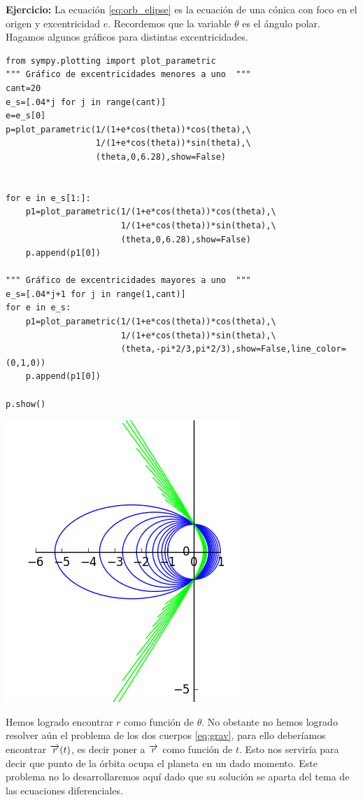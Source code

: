 \noindent\textbf{Ejercicio:} La ecuación \eqref{eq:orb_elipse} es la ecuación de una cónica con foco en el origen y excentricidad $e$.
Recordemos que la variable $\theta$ es el ángulo polar. Hagamos algunos gráficos para distintas excentricidades.
\begin{lstlisting}
from sympy.plotting import plot_parametric
""" Gráfico de excentricidades menores a uno  """
cant=20
e_s=[.04*j for j in range(cant)]
e=e_s[0]
p=plot_parametric(1/(1+e*cos(theta))*cos(theta),\
                  1/(1+e*cos(theta))*sin(theta),\
                  (theta,0,6.28),show=False)


for e in e_s[1:]:
    p1=plot_parametric(1/(1+e*cos(theta))*cos(theta),\
                       1/(1+e*cos(theta))*sin(theta),\
                       (theta,0,6.28),show=False)
    p.append(p1[0])

""" Gráfico de excentricidades mayores a uno  """
e_s=[.04*j+1 for j in range(1,cant)]
for e in e_s:
    p1=plot_parametric(1/(1+e*cos(theta))*cos(theta),\
                       1/(1+e*cos(theta))*sin(theta),\
                       (theta,-pi*2/3,pi*2/3),show=False,line_color=(0,1,0))
    p.append(p1[0])

p.show()
\end{lstlisting}

\begin{center}
\includegraphics[scale=.5]{imagenes/conicas.png}
\end{center}


Hemos logrado encontrar $r$ como función de $\theta$. No obstante
no hemos logrado resolver aún el problema de los dos cuerpos \eqref{eq:grav}, para ello deberíamos encontrar $\overrightarrow{r}(t)$, es decir poner a $
\overrightarrow{r}$ como función de $t$. Esto nos serviría para decir que punto de la órbita ocupa el planeta en un dado momento. Este problema no lo desarrollaremos aquí dado
que su solución se aparta del tema de las ecuaciones diferenciales.


